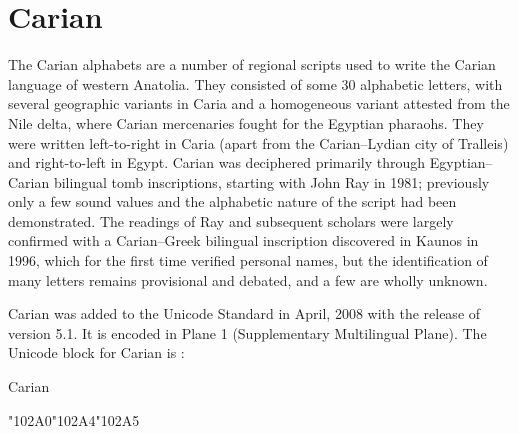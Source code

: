 \section{Carian}
\label{sec:carian}
The Carian alphabets are a number of regional scripts used to write the Carian language of western Anatolia. They consisted of some 30 alphabetic letters, with several geographic variants in Caria and a homogeneous variant attested from the Nile delta, where Carian mercenaries fought for the Egyptian pharaohs. They were written left-to-right in Caria (apart from the Carian–Lydian city of Tralleis) and right-to-left in Egypt. Carian was deciphered primarily through Egyptian–Carian bilingual tomb inscriptions, starting with John Ray in 1981; previously only a few sound values and the alphabetic nature of the script had been demonstrated. The readings of Ray and subsequent scholars were largely confirmed with a Carian–Greek bilingual inscription discovered in Kaunos in 1996, which for the first time verified personal names, but the identification of many letters remains provisional and debated, and a few are wholly unknown.

Carian was added to the Unicode Standard in April, 2008 with the release of version 5.1. It is encoded in Plane 1 (Supplementary Multilingual Plane).
The Unicode block for Carian is :

\begin{scriptexample}[]{Carian}
\end{scriptexample}

\newenvironment{carianscript}
{\carian
 \def\A{\char"102A0}
 \def\Uuu{\char"102A4} 
 \def\R{\char"102A5}
}
{}


\begin{carianscript}
\A \Uuu \R
\end{carianscript}


